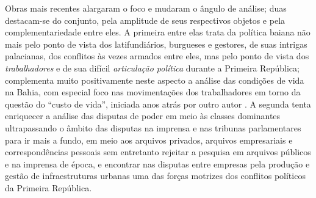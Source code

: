 Obras mais recentes alargaram o foco e mudaram o ângulo de análise; duas destacam-se do conjunto, pela amplitude de seus respectivos objetos e pela complementariedade entre eles. A primeira entre elas \cite{castellucci_maquina_2008} trata da política baiana não mais pelo ponto de vista dos latifundiários, burgueses e gestores, de suas intrigas palacianas, dos conflitos às vezes armados entre eles, mas pelo ponto de vista dos \textit{trabalhadores} e de sua difícil \textit{articulação política} durante a Primeira República; complementa muito positivamente neste aspecto a análise das condições de vida na Bahia, com especial foco nas movimentações dos trabalhadores em torno da questão do ``custo de vida'', iniciada anos atrás por outro autor \cite{santos_repovo_2001}. A segunda \cite{CUNHA2011} tenta enriquecer a análise das disputas de poder em meio às classes dominantes ultrapassando o âmbito das disputas na imprensa e nas tribunas parlamentares para ir mais a fundo, em meio aos arquivos privados, arquivos empresariais e correspondências pessoais sem entretanto rejeitar a pesquisa em arquivos públicos e na imprensa de época, e encontrar nas disputas entre empresas pela produção e gestão de infraestruturas urbanas uma das forças motrizes dos conflitos políticos da Primeira República.

